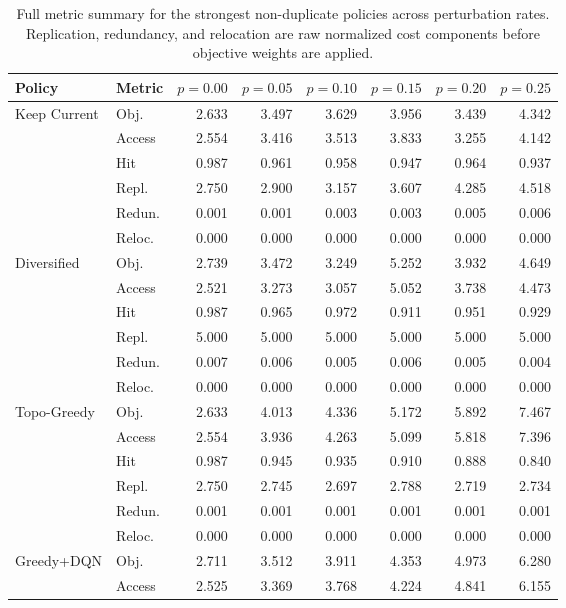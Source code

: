 \begin{table}[t]
\centering
\caption{Full metric summary for the strongest non-duplicate policies across perturbation rates. Replication, redundancy, and relocation are raw normalized cost components before objective weights are applied.}
\label{tab:generated_compact_metrics}
\scriptsize
\setlength{\tabcolsep}{1.6pt}
\begin{tabular}{llrrrrrr}
\toprule
Policy & Metric & $p=0.00$ & $p=0.05$ & $p=0.10$ & $p=0.15$ & $p=0.20$ & $p=0.25$ \\
\midrule
Keep Current & Obj. & 2.633 & 3.497 & 3.629 & 3.956 & 3.439 & 4.342 \\
 & Access & 2.554 & 3.416 & 3.513 & 3.833 & 3.255 & 4.142 \\
 & Hit & 0.987 & 0.961 & 0.958 & 0.947 & 0.964 & 0.937 \\
 & Repl. & 2.750 & 2.900 & 3.157 & 3.607 & 4.285 & 4.518 \\
 & Redun. & 0.001 & 0.001 & 0.003 & 0.003 & 0.005 & 0.006 \\
 & Reloc. & 0.000 & 0.000 & 0.000 & 0.000 & 0.000 & 0.000 \\
\addlinespace[1pt]
Diversified & Obj. & 2.739 & 3.472 & 3.249 & 5.252 & 3.932 & 4.649 \\
 & Access & 2.521 & 3.273 & 3.057 & 5.052 & 3.738 & 4.473 \\
 & Hit & 0.987 & 0.965 & 0.972 & 0.911 & 0.951 & 0.929 \\
 & Repl. & 5.000 & 5.000 & 5.000 & 5.000 & 5.000 & 5.000 \\
 & Redun. & 0.007 & 0.006 & 0.005 & 0.006 & 0.005 & 0.004 \\
 & Reloc. & 0.000 & 0.000 & 0.000 & 0.000 & 0.000 & 0.000 \\
\addlinespace[1pt]
Topo-Greedy & Obj. & 2.633 & 4.013 & 4.336 & 5.172 & 5.892 & 7.467 \\
 & Access & 2.554 & 3.936 & 4.263 & 5.099 & 5.818 & 7.396 \\
 & Hit & 0.987 & 0.945 & 0.935 & 0.910 & 0.888 & 0.840 \\
 & Repl. & 2.750 & 2.745 & 2.697 & 2.788 & 2.719 & 2.734 \\
 & Redun. & 0.001 & 0.001 & 0.001 & 0.001 & 0.001 & 0.001 \\
 & Reloc. & 0.000 & 0.000 & 0.000 & 0.000 & 0.000 & 0.000 \\
\addlinespace[1pt]
Greedy+DQN & Obj. & 2.711 & 3.512 & 3.911 & 4.353 & 4.973 & 6.280 \\
 & Access & 2.525 & 3.369 & 3.768 & 4.224 & 4.841 & 6.155 \\

\end{tabular}
\end{table}
